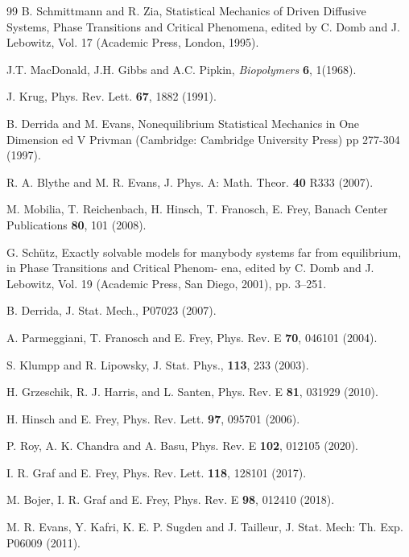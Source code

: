 \documentclass[aps,pre,twocolumn,superscriptaddress,amsmath,amssymb,longbibliography,floatfix,nofootinbib]{revtex4}
\begin{document}
{


\begin{thebibliography}{99}
 B. Schmittmann and R. Zia, Statistical Mechanics of Driven
Diffusive Systems, Phase Transitions and Critical Phenomena, edited by C. Domb and J. Lebowitz, Vol. 17 (Academic Press, London, 1995).

  J.T. MacDonald, J.H. Gibbs and A.C. Pipkin, {\em Biopolymers} {\bf 6}, 1(1968).
 
  J. Krug, Phys. Rev. Lett. {\bf 67}, 1882 (1991).


 B. Derrida  and M. Evans,   Nonequilibrium Statistical Mechanics in One Dimension ed V Privman (Cambridge: Cambridge University Press) pp 277-304 (1997).

 R. A. Blythe and M. R. Evans,  J. Phys. A: Math. Theor. {\bf 40} R333  (2007).

 M. Mobilia, T. Reichenbach, H. Hinsch, T. Franosch, E. Frey,
Banach Center Publications {\bf 80}, 101 (2008).

 G. Sch\"{u}tz, Exactly solvable models for manybody systems far from equilibrium, in Phase Transitions and Critical Phenom-
ena, edited by C. Domb and J. Lebowitz, Vol. 19 (Academic
Press, San Diego, 2001), pp. 3–251.


 B. Derrida,  J. Stat. Mech., P07023 (2007).

 A. Parmeggiani, T. Franosch and E. Frey,  Phys. Rev. E {\bf 70}, 046101 (2004).


 S. Klumpp and R. Lipowsky, J. Stat. Phys., {\bf 113}, 233 (2003).

 H. Grzeschik, R. J. Harris, and L. Santen,  Phys. Rev. E {\bf 81}, 031929 (2010).

 H. Hinsch and E. Frey,  Phys. Rev. Lett. {\bf 97}, 095701 (2006).

 P. Roy, A. K. Chandra and A. Basu, Phys. Rev. E {\bf 102}, 012105 (2020).

 I. R. Graf and E. Frey, Phys. Rev. Lett. {\bf 118}, 128101 (2017).

 M. Bojer, I. R. Graf and E. Frey, Phys. Rev. E {\bf 98}, 012410 (2018).

 M. R. Evans, Y. Kafri, K. E. P. Sugden and J. Tailleur, J. Stat. Mech: Th. Exp. P06009 (2011).


\end{thebibliography}}
\end{document}
